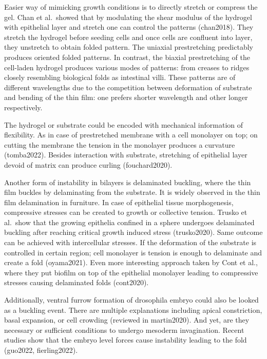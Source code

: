 \documentclass[
]{article}
\begin{document}
Easier way of mimicking growth conditions is to directly stretch or
compress the gel. Chan et al.~showed that by modulating the shear
modulus of the hydrogel with epithelial layer and stretch one can
control the patterns (chan2018). They stretch the hydrogel before
seeding cells and once cells are confluent into layer, they unstretch to
obtain folded pattern. The uniaxial prestretching predictably produces
oriented folded patterns. In contrast, the biaxial prestretching of the
cell-laden hydrogel produces various modes of patterns: from creases to
ridges closely resembling biological folds as intestinal villi. These
patterns are of different wavelengths due to the competition between
deformation of substrate and bending of the thin film: one prefers
shorter wavelength and other longer respectively.

The hydrogel or substrate could be encoded with mechanical information
of flexibility. As in case of prestretched membrane with a cell
monolayer on top; on cutting the membrane the tension in the monolayer
produces a curvature (tomba2022). Besides interaction with substrate,
stretching of epithelial layer devoid of matrix can produce curling
(fouchard2020).

Another form of instability in bilayers is delaminated buckling, where
the thin film buckles by delaminating from the substrate. It is widely
observed in the thin film delamination in furniture. In case of
epithelial tissue morphogenesis, compressive stresses can be created to
growth or collective tension. Trusko et al.~show that the growing
epithelia confined in a sphere undergoes delaminated buckling after
reaching critical growth induced stress (trusko2020). Same outcome can
be achieved with intercellular stresses. If the deformation of the
substrate is controlled in certain region; cell monolayer is tension is
enough to delaminate and create a fold (oyama2021). Even more
interesting approach taken by Cont et al., where they put biofilm on top
of the epithelial monolayer leading to compressive stresses causing
delaminated folds (cont2020).

Additionally, ventral furrow formation of drosophila embryo could also
be looked as a buckling event. There are multiple explanations including
apical constriction, basal expansion, or cell crowding (reviewed in
martin2020). And yet, are they necessary or sufficient conditions to
undergo mesoderm invagination. Recent studies show that the embryo level
forces cause instability leading to the fold (guo2022, fierling2022).
\end{document}
